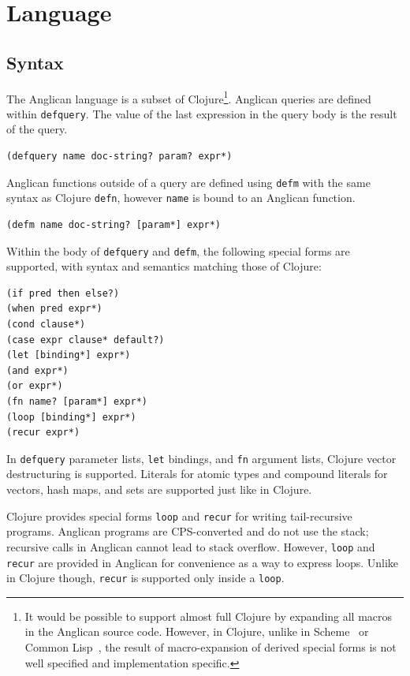 \documentclass[preprint]{sigplanconf}
\begin{document}
\section{Language}
\label{sec:language}

\subsection{Syntax}

The Anglican language is a subset of Clojure\footnote{It would be
possible to support almost full Clojure by expanding all macros
in the Anglican source code. However, in Clojure, unlike in
Scheme~\cite{SDF+10} or Common Lisp~\cite{PC94}, the result
of macro-expansion of derived special forms is not well
specified and implementation specific.}.  Anglican queries
are defined within \texttt{defquery}. The value of the last
expression in the query body is the result of the query.
\begin{lstlisting}[style=default]
(defquery name doc-string? param? expr*)
\end{lstlisting}
Anglican functions outside of a query are defined using
\texttt{defm} with the same syntax as Clojure \texttt{defn},
however \texttt{name} is bound to an Anglican function.
\begin{lstlisting}[style=default]
(defm name doc-string? [param*] expr*)
\end{lstlisting}
Within the body of \texttt{defquery} and \texttt{defm}, the
following special forms are supported, with syntax and semantics 
matching those of Clojure:
\begin{lstlisting}[style=default]
(if pred then else?)
(when pred expr*)
(cond clause*)
(case expr clause* default?)
(let [binding*] expr*)
(and expr*)
(or expr*)
(fn name? [param*] expr*)
(loop [binding*] expr*)
(recur expr*)
\end{lstlisting}
In \texttt{defquery} parameter lists, \texttt{let} bindings, and
\texttt{fn} argument lists, Clojure vector destructuring is
supported. Literals for atomic types and compound literals for
vectors, hash maps, and sets are supported just like in Clojure.

Clojure provides special forms \texttt{loop} and \texttt{recur}
for writing tail-recursive programs.  Anglican programs are
CPS-converted and do not use the stack; recursive calls
in Anglican cannot lead to stack overflow.  However,
\texttt{loop} and \texttt{recur} are provided in Anglican for
convenience as a way to express loops. Unlike in Clojure though,
\texttt{recur} is supported only inside a \texttt{loop}.
\end{document}
